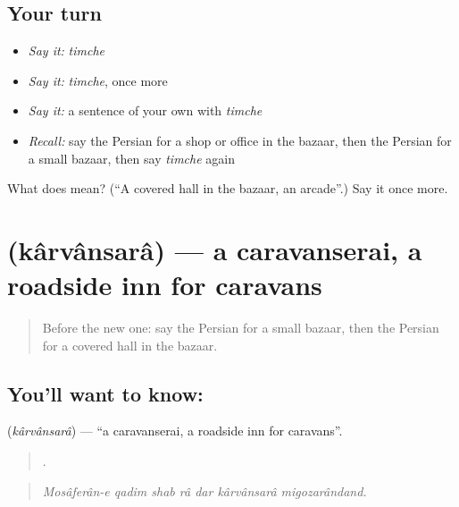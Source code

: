 \subsection*{Your turn}
\begin{itemize}
\raggedright
  \item \emph{Say it:} \emph{timche}
  \item \emph{Say it:} \emph{timche}, once more
  \item \emph{Say it:} a sentence of your own with \emph{timche}
  \item \emph{Recall:} say the Persian for a shop or office in the bazaar, then the Persian for a small bazaar, then say \emph{timche} again
\end{itemize}

\begin{tcolorbox}[breakable,colback=teal!4,colframe=teal!35!black,title={Before you move on}]
What does  mean? (\textquotedblleft{}A covered hall in the bazaar, an arcade\textquotedblright{}.) Say it once more.
\end{tcolorbox}
\section[\texorpdfstring{\fa{کاروانسرا} (kârvânsarâ)}{کاروانسرا (kârvânsarâ)}]{ (kârvânsarâ) — a caravanserai, a roadside inn for caravans}

\label{lesson:FA-C457-karvansara}



\begin{quote}
Before the new one: say the Persian for a small bazaar, then the Persian for a covered hall in the bazaar.
\end{quote}

\subsection*{You'll want to know: }
\textbf{} (\emph{kârvânsarâ}) — \textquotedblleft{}a caravanserai, a roadside inn for caravans\textquotedblright{}.

\begin{quote}
      .
\end{quote}

\begin{quote}
\emph{Mosâferân-e qadim shab râ dar kârvânsarâ migozarândand.}
\end{quote}


